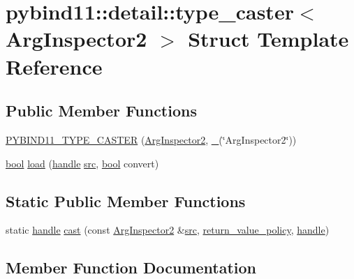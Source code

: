 \hypertarget{structpybind11_1_1detail_1_1type__caster_3_01_arg_inspector2_01_4}{}\section{pybind11\+::detail\+::type\+\_\+caster$<$ Arg\+Inspector2 $>$ Struct Template Reference}
\label{structpybind11_1_1detail_1_1type__caster_3_01_arg_inspector2_01_4}
\subsection*{Public Member Functions}
\begin{DoxyCompactItemize}
\item 
\mbox{\hyperlink{structpybind11_1_1detail_1_1type__caster_3_01_arg_inspector2_01_4_a53acb0b05e481dd100705fe17ff77cbd}{P\+Y\+B\+I\+N\+D11\+\_\+\+T\+Y\+P\+E\+\_\+\+C\+A\+S\+T\+ER}} (\mbox{\hyperlink{class_arg_inspector2}{Arg\+Inspector2}}, \mbox{\hyperlink{descr_8h_af114703e20c6527e87163eb2798f74b8}{\+\_\+}}(\char`\"{}Arg\+Inspector2\char`\"{}))
\item 
\mbox{\hyperlink{asdl_8h_af6a258d8f3ee5206d682d799316314b1}{bool}} \mbox{\hyperlink{structpybind11_1_1detail_1_1type__caster_3_01_arg_inspector2_01_4_aeb3a180d004e5c400fbc18571ce959c3}{load}} (\mbox{\hyperlink{classhandle}{handle}} \mbox{\hyperlink{_s_d_l__opengl__glext_8h_a72e0fdf0f845ded60b1fada9e9195cd7}{src}}, \mbox{\hyperlink{asdl_8h_af6a258d8f3ee5206d682d799316314b1}{bool}} convert)
\end{DoxyCompactItemize}
\subsection*{Static Public Member Functions}
\begin{DoxyCompactItemize}
\item 
static \mbox{\hyperlink{classhandle}{handle}} \mbox{\hyperlink{structpybind11_1_1detail_1_1type__caster_3_01_arg_inspector2_01_4_adc8c74d0723dbb2efddc8ea9c7c77849}{cast}} (const \mbox{\hyperlink{class_arg_inspector2}{Arg\+Inspector2}} \&\mbox{\hyperlink{_s_d_l__opengl__glext_8h_a72e0fdf0f845ded60b1fada9e9195cd7}{src}}, \mbox{\hyperlink{detail_2common_8h_adde72ab1fb0dd4b48a5232c349a53841}{return\+\_\+value\+\_\+policy}}, \mbox{\hyperlink{classhandle}{handle}})
\end{DoxyCompactItemize}


\subsection{Member Function Documentation}
\mbox{\label{structpybind11_1_1detail_1_1type__caster_3_01_arg_inspector2_01_4_adc8c74d0723dbb2efddc8ea9c7c77849}} 
